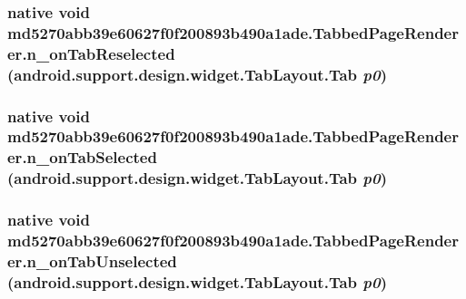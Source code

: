 \hypertarget{classmd5270abb39e60627f0f200893b490a1ade_1_1_tabbed_page_renderer_01ec360f376442d355008cdf6cb168b4}{
\subsubsection[{n\_\-onTabReselected}]{\setlength{\rightskip}{0pt plus 5cm}native void md5270abb39e60627f0f200893b490a1ade.TabbedPageRenderer.n\_\-onTabReselected (android.support.design.widget.TabLayout.Tab {\em p0})}}
\label{classmd5270abb39e60627f0f200893b490a1ade_1_1_tabbed_page_renderer_01ec360f376442d355008cdf6cb168b4}


\hypertarget{classmd5270abb39e60627f0f200893b490a1ade_1_1_tabbed_page_renderer_1bd14ca1c0228a1aa5548d9f76c1a490}{
\subsubsection[{n\_\-onTabSelected}]{\setlength{\rightskip}{0pt plus 5cm}native void md5270abb39e60627f0f200893b490a1ade.TabbedPageRenderer.n\_\-onTabSelected (android.support.design.widget.TabLayout.Tab {\em p0})}}
\label{classmd5270abb39e60627f0f200893b490a1ade_1_1_tabbed_page_renderer_1bd14ca1c0228a1aa5548d9f76c1a490}


\hypertarget{classmd5270abb39e60627f0f200893b490a1ade_1_1_tabbed_page_renderer_0253eb405a19b6bcb6a1b48b68afbd83}{
\subsubsection[{n\_\-onTabUnselected}]{\setlength{\rightskip}{0pt plus 5cm}native void md5270abb39e60627f0f200893b490a1ade.TabbedPageRenderer.n\_\-onTabUnselected (android.support.design.widget.TabLayout.Tab {\em p0})}}
\label{classmd5270abb39e60627f0f200893b490a1ade_1_1_tabbed_page_renderer_0253eb405a19b6bcb6a1b48b68afbd83}


